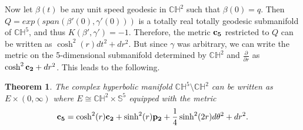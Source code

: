 \documentclass[10pt]{amsart}
\def\s{\sigma}
\def\S{\mathcal{S}}
\def\b{\beta}
\def\g{\gamma}
\def\ddr{\frac{\partial}{\partial r}}
\def\th{\theta}
\def\H{\mathbb{H}}
\def\C{\mathbb{C}}
\def\S{\mathbb{S}}
\newtheorem{theorem}{Theorem}[section]
\theoremstyle{definition}
\theoremstyle{remark}
\numberwithin{equation}{section}
\begin{document}

Now let $\b(t)$ be any unit speed geodesic in $\C \H^2$ such that $\b(0) = q$.  
Then $Q = exp(span(\b'(0), \g'(0)))$ is a totally real totally geodesic submanifold of $\C \H^5$, and thus $K(\b', \g') = -1$.  
Therefore, the metric ${\bf c_5}$ restricted to $Q$ can be written as $\cosh^2(r) dt^2 + dr^2$.  
But since $\g$ was arbitrary, we can write the metric on the 5-dimensional submanifold determined by $\C \H^2$ and $\ddr$ as $\cosh^2 {\bf c_2} + dr^2$.
This leads to the following.

\vskip 20pt

\begin{theorem}\label{thm:chn/chk metric}
The complex hyperbolic manifold $\C \H^5 \setminus \C \H^2$ can be written as $E \times (0, \infty)$  where $E \cong \C \H^2 \times \S^5$ equipped with the metric
	\begin{equation}\label{eqn:chn/chk metric}
	{\bf c_5} = \cosh^2(r) {\bf c_2} + \sinh^2(r) {\bf p_2} + \frac{1}{4} \sinh^2(2r) d \th^2 + dr^2 .
	\end{equation}
\end{theorem}

\vskip 10pt
\end{document}
